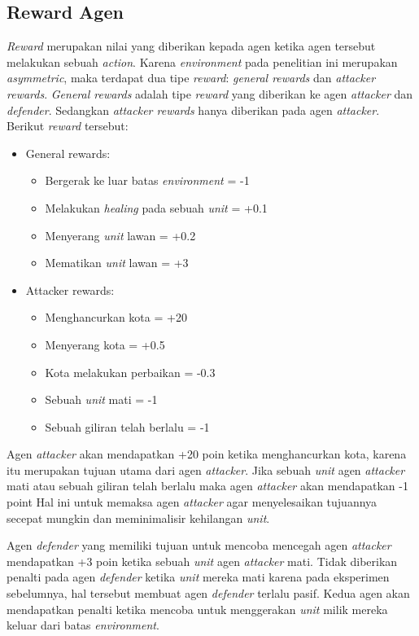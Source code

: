 \subsection{Reward Agen}
\emph{Reward} merupakan nilai yang diberikan kepada agen ketika agen tersebut melakukan sebuah \emph{action}.
Karena \emph{environment} pada penelitian ini merupakan \emph{asymmetric}, maka terdapat dua tipe \emph{reward}:
\emph{general rewards} dan \emph{attacker rewards}. 
\emph{General rewards} adalah tipe \emph{reward} yang diberikan ke agen \emph{attacker} dan \emph{defender}.
Sedangkan \emph{attacker rewards} hanya diberikan pada agen \emph{attacker}.
Berikut \emph{reward} tersebut:
\begin{itemize}
  \item General rewards: \begin{itemize}
      \item Bergerak ke luar batas \emph{environment} = -1
      \item Melakukan \emph{healing} pada sebuah \emph{unit} = +0.1
      \item Menyerang \emph{unit} lawan = +0.2
      \item Mematikan \emph{unit} lawan = +3
  \end{itemize}
  \item Attacker rewards: \begin{itemize}
      \item Menghancurkan kota = +20
      \item Menyerang kota = +0.5
      \item Kota melakukan perbaikan = -0.3
      \item Sebuah \emph{unit} mati = -1
      \item Sebuah giliran telah berlalu = -1
  \end{itemize}
\end{itemize}

Agen \emph{attacker} akan mendapatkan +20 poin ketika menghancurkan kota, karena itu merupakan tujuan utama dari agen \emph{attacker}.
Jika sebuah \emph{unit} agen \emph{attacker} mati atau sebuah giliran telah berlalu maka agen \emph{attacker} akan mendapatkan -1 point
Hal ini untuk memaksa agen \emph{attacker} agar menyelesaikan tujuannya secepat mungkin dan meminimalisir kehilangan \emph{unit}.

Agen \emph{defender} yang memiliki tujuan untuk mencoba mencegah agen \emph{attacker} mendapatkan +3 poin ketika sebuah \emph{unit}
agen \emph{attacker} mati. Tidak diberikan penalti pada agen \emph{defender} ketika \emph{unit} mereka mati karena pada eksperimen sebelumnya,
hal tersebut membuat agen \emph{defender} terlalu pasif. Kedua agen akan mendapatkan penalti ketika mencoba untuk menggerakan \emph{unit}
milik mereka keluar dari batas \emph{environment}.


